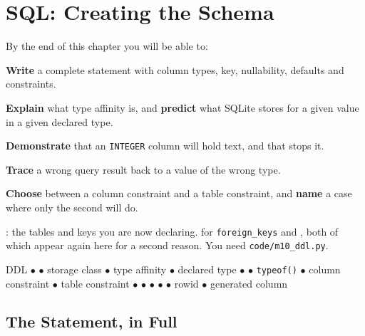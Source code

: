 \chapter{SQL: Creating the Schema}\label{ch:ddl}

\begin{outcomes}
By the end of this chapter you will be able to:
\begin{tight}
  \item \textbf{Write} a complete  statement with column
        types, key, nullability, defaults and  constraints.
  \item \textbf{Explain} what type affinity is, and \textbf{predict} what
        SQLite stores for a given value in a given declared type.
  \item \textbf{Demonstrate} that an \texttt{INTEGER} column will hold text,
        and that  stops it.
  \item \textbf{Trace} a wrong query result back to a value of the wrong type.
  \item \textbf{Choose} between a column constraint and a table constraint, and
        \textbf{name} a case where only the second will do.
\end{tight}
\end{outcomes}

\begin{prereq}
: the tables and keys you are now declaring.
 for  \texttt{foreign\_keys} and , both of which appear again here for a second reason. You need
\texttt{code/m10\_ddl.py}.
\end{prereq}

\begin{keyterms}
DDL $\bullet$  $\bullet$
storage class $\bullet$ type affinity $\bullet$ declared type $\bullet$
 $\bullet$ \texttt{typeof()} $\bullet$ column constraint
$\bullet$ table constraint $\bullet$  $\bullet$ 
$\bullet$  $\bullet$  $\bullet$ rowid
$\bullet$ generated column
\end{keyterms}

\section{The Statement, in Full}

